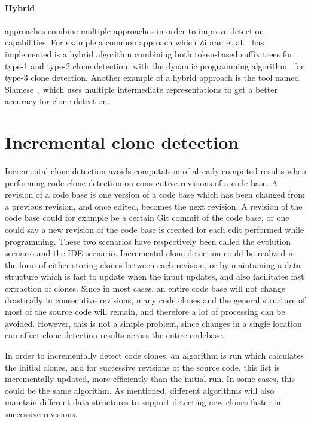 \paragraph{Hybrid} approaches combine multiple approaches in order to improve detection
capabilities. For example a common approach which Zibran et
al.~\cite{Zibran_real_time_search} has implemented is a hybrid algorithm combining both
token-based suffix trees for type-1 and type-2 clone detection, with the dynamic
programming algorithm~\cite{BakerSparseDynamicProgramming} for type-3 clone detection.
Another example of a hybrid approach is the tool named
Siamese~\cite{SiameseScalableAndIncrementalClone}, which uses multiple intermediate
representations to get a better accuracy for clone detection.


\section{Incremental clone detection}

Incremental clone detection avoids computation of already computed results when performing
code clone detection on consecutive revisions of a code base.  A revision of a code base
is one version of a code base which has been changed from a previous revision, and once
edited, becomes the next revision.  A revision of the code base could for example be a
certain Git commit of the code base, or one could say a new revision of the code base is
created for each edit performed while programming. These two scenarios have respectively
been called the evolution scenario and the IDE scenario. Incremental clone detection could
be realized in the form of either storing clones between each revision, or by maintaining
a data structure which is fast to update when the input updates, and also facilitates fast
extraction of clones. Since in most cases, an entire code base will not change drastically
in consecutive revisions, many code clones and the general structure of most of the source
code will remain, and therefore a lot of processing can be avoided. However, this is not a
simple problem, since changes in a single location can affect clone detection results
across the entire codebase.

In order to incrementally detect code clones, an algorithm is run which calculates the
initial clones, and for successive revisions of the source code, this list is
incrementally updated, more efficiently than the initial run. In some cases, this could be
the same algorithm. As mentioned, different algorithms will also maintain different data
structures to support detecting new clones faster in successive revisions.

